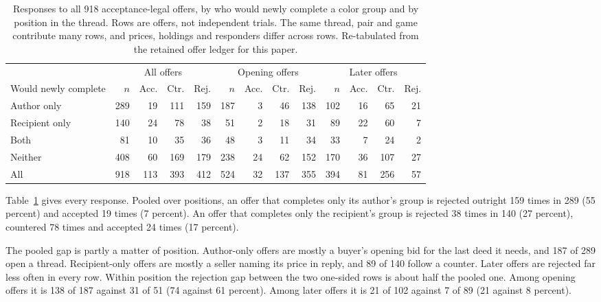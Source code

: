 \begin{table}[t]
\centering\small
\setlength{\tabcolsep}{4.2pt}
\begin{tabular}{@{}lrrrrrrrrrrrr@{}}
\toprule
 & \multicolumn{4}{c}{All offers} & \multicolumn{4}{c}{Opening offers} & \multicolumn{4}{c}{Later offers}\\
\cmidrule(lr){2-5}\cmidrule(lr){6-9}\cmidrule(l){10-13}
Would newly complete & $n$ & Acc. & Ctr. & Rej. & $n$ & Acc. & Ctr. & Rej. & $n$ & Acc. & Ctr. & Rej.\\
\midrule
Author only & 289 & 19 & 111 & 159 & 187 & 3 & 46 & 138 & 102 & 16 & 65 & 21\\
Recipient only & 140 & 24 & 78 & 38 & 51 & 2 & 18 & 31 & 89 & 22 & 60 & 7\\
Both & 81 & 10 & 35 & 36 & 48 & 3 & 11 & 34 & 33 & 7 & 24 & 2\\
Neither & 408 & 60 & 169 & 179 & 238 & 24 & 62 & 152 & 170 & 36 & 107 & 27\\
\midrule
All & 918 & 113 & 393 & 412 & 524 & 32 & 137 & 355 & 394 & 81 & 256 & 57\\
\bottomrule
\end{tabular}
\caption{Responses to all 918 acceptance-legal offers, by who would newly complete a color group and by position in the thread. Rows are offers, not independent trials. The same thread, pair and game contribute many rows, and prices, holdings and responders differ across rows. Re-tabulated from the retained offer ledger for this paper.}
\label{tab:cells}
\end{table}

Table~\ref{tab:cells} gives every response. Pooled over positions, an offer that completes only its author's group is rejected outright 159 times in 289 (55 percent) and accepted 19 times (7 percent). An offer that completes only the recipient's group is rejected 38 times in 140 (27 percent), countered 78 times and accepted 24 times (17 percent).

The pooled gap is partly a matter of position. Author-only offers are mostly a buyer's opening bid for the last deed it needs, and 187 of 289 open a thread. Recipient-only offers are mostly a seller naming its price in reply, and 89 of 140 follow a counter. Later offers are rejected far less often in every row. Within position the rejection gap between the two one-sided rows is about half the pooled one. Among opening offers it is 138 of 187 against 31 of 51 (74 against 61 percent). Among later offers it is 21 of 102 against 7 of 89 (21 against 8 percent).

